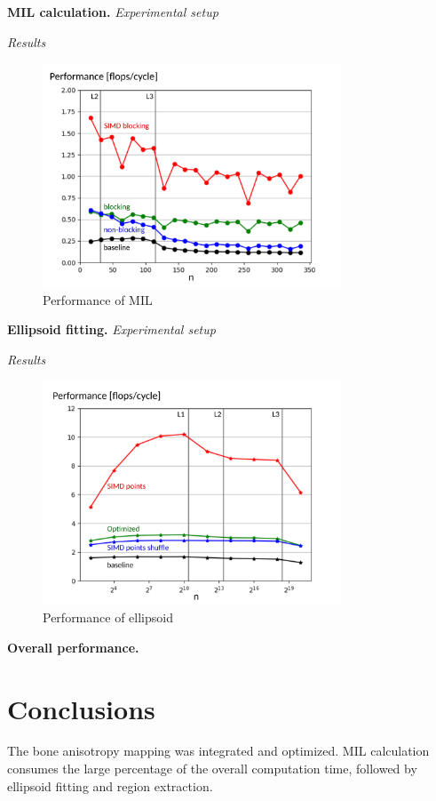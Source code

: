 \documentclass[letterpaper]{article}
\newcommand{\mypar}[1]{{\bf #1.}}
\begin{document}
\mypar{MIL calculation} \textit{Experimental setup}

\textit{Results}

\begin{figure}[H]
  \centering
  \includegraphics[width=3.5in]{figs/plots/mil/mil_performance_labelled.png}
  \caption{Performance of MIL}
  \label{res:mil}
\end{figure}


\mypar{Ellipsoid fitting} \textit{Experimental setup}

\textit{Results}
 
\begin{figure}[H]
  \centering \includegraphics[width=3.5in]{figs/plots/ellipsoid/ellipsoid_performance_labelled.png}
  \caption{Performance of ellipsoid}
  \label{res:ellipsoid}
\end{figure}


\mypar{Overall performance}

\section{Conclusions}

The bone anisotropy mapping was integrated and optimized. MIL calculation consumes the large percentage of the overall computation time, followed by ellipsoid fitting and region extraction. 
\end{document}
